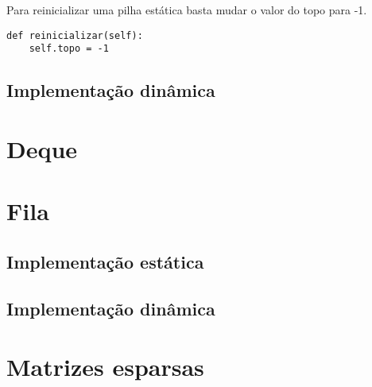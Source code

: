 \documentclass[a4paper, twocolumn]{article}
\theoremstyle{definition}
\begin{document}
Para reinicializar uma pilha estática basta mudar o valor do topo para -1.
\begin{lstlisting}[label=pilha_tamanho, caption= Pilha estática (reinicializar)]
def reinicializar(self):
    self.topo = -1
\end{lstlisting}

\subsection{Implementação dinâmica}

\section{Deque}

\section{Fila}

\subsection{Implementação estática}

\subsection{Implementação dinâmica}

\section{Matrizes esparsas}
\end{document}
